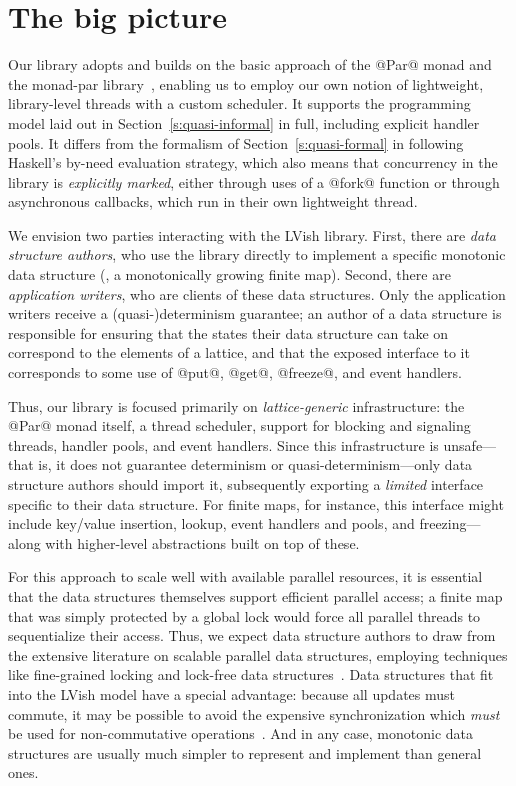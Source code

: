 \section{The big picture}\label{s:lvish-big-picture}

Our library adopts and builds on the basic approach of the @Par@ monad
and the monad-par library~\cite{monad-par}, enabling us to employ our
own notion of lightweight, library-level threads with a custom
scheduler.  It supports the programming model laid out in
Section~\ref{s:quasi-informal} in full, including explicit handler
pools.  It differs from the formalism of Section~\ref{s:quasi-formal}
in following Haskell's by-need evaluation strategy, which also means
that concurrency in the library is \emph{explicitly marked}, either
through uses of a @fork@ function or through asynchronous callbacks,
which run in their own lightweight thread.

We envision two parties interacting with the LVish library.  First,
there are \emph{data structure authors}, who use the library directly
to implement a specific monotonic data structure (\eg, a monotonically
growing finite map).  Second, there are \emph{application writers},
who are clients of these data structures.  Only the application
writers receive a \mbox{(quasi-)determinism} guarantee; an author of a
data structure is responsible for ensuring that the states their data
structure can take on correspond to the elements of a lattice, and
that the exposed interface to it corresponds to some use of @put@,
@get@, @freeze@, and event handlers.

Thus, our library is focused primarily on \emph{lattice-generic}
infrastructure: the @Par@ monad itself, a thread scheduler, support
for blocking and signaling threads, handler pools, and event handlers.
Since this infrastructure is unsafe---that is, it does not guarantee
determinism or quasi-determinism---only data structure authors should
import it, subsequently exporting a \emph{limited} interface specific
to their data structure.  For finite maps, for instance, this
interface might include key/value insertion, lookup, event handlers
and pools, and freezing---along with higher-level abstractions built
on top of these.

For this approach to scale well with available parallel resources, it
is essential that the data structures themselves support efficient
parallel access; a finite map that was simply protected by a global
lock would force all parallel threads to sequentialize their access.
Thus, we expect data structure authors to draw from the extensive
literature on scalable parallel data structures, employing techniques
like fine-grained locking and lock-free data structures~\cite{art}.
Data structures that fit into the LVish model have a special
advantage: because all updates must commute, it may be possible to
avoid the expensive synchronization which \emph{must} be used for
non-commutative operations~\cite{lawsOfOrder}.  And in any case,
monotonic data structures are usually much simpler to represent and
implement than general ones. 

